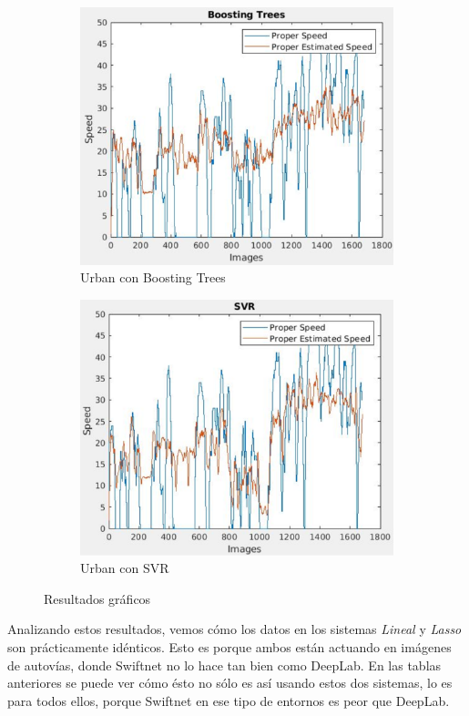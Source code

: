 \begin{figure}[H]
\begin{subfigure}[b]{0.45\linewidth}
    \includegraphics[width=\linewidth]{Figuras/Boosting_Urban(Nivel_1).eps}
    \caption{Urban con Boosting Trees}
  \end{subfigure}
      \begin{subfigure}[b]{0.45\linewidth}
    \includegraphics[width=\linewidth]{Figuras/SVR_Urban(Nivel_1).eps}
    \caption{Urban con SVR}
  \end{subfigure}
  \caption{Resultados gráficos}
\end{figure}

Analizando estos resultados, vemos cómo los datos en los sistemas \textit{Lineal} y \textit{Lasso} son prácticamente idénticos. Esto es porque ambos están actuando en imágenes de autovías, donde Swiftnet no lo hace tan bien como DeepLab. En las tablas anteriores se puede ver cómo ésto no sólo es así usando estos dos sistemas, lo es para todos ellos, porque Swiftnet en ese tipo de entornos es peor que DeepLab.

